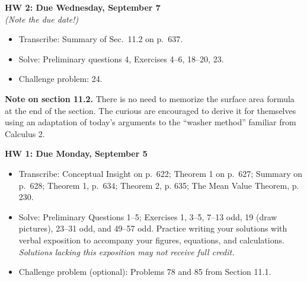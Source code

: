 \documentclass[10pt]{amsart}
\begin{document}
\begin{center}
\textbf{HW 2: Due Wednesday, September 7} \\ \emph{(Note the due date!)}
\end{center}
\begin{itemize}
    \item Transcribe: Summary of Sec.\ 11.2 on p.\ 637.
    \item Solve: Preliminary questions 4, Exercises 4--6, 18--20, 23.
    \item Challenge problem: 24.
\end{itemize}
\textbf{Note on section 11.2.} There is no need to memorize the surface area formula at the end of the section. The curious are encouraged to derive it for themselves using an adaptation of today's arguments to the ``washer method'' familiar from Calculus 2.

\begin{center}
\textbf{HW 1: Due Monday, September 5}
\end{center}
\begin{itemize}
    \item Transcribe: Conceptual Insight on p.\ 622; Theorem 1 on p.\ 627; Summary on p.\ 628; Theorem 1, p.\ 634; Theorem 2, p. 635; The Mean Value Theorem, p. 230.
    \item Solve: Preliminary Questions 1--5; Exercises 1, 3--5, 7--13 odd, 19 (draw pictures), 23--31 odd, and 49--57 odd. Practice writing your solutions with verbal exposition to accompany your figures, equations, and calculations. \emph{Solutions lacking this exposition may not receive full credit.}
    \item Challenge problem (optional): Problems 78 and 85 from Section 11.1.
\end{itemize}
\end{document}
